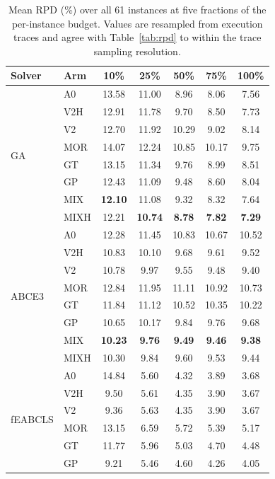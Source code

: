 \documentclass[review]{elsarticle}
\begin{document}
\begin{table}[htbp]
\centering
\caption{Mean RPD (\%) over all 61 instances at five fractions of the
per-instance budget. Values are resampled from execution traces and agree
with Table~\ref{tab:rpd} to within the trace sampling resolution.}
\label{tab:budgetfrac}
\footnotesize
\begin{tabular}{llccccc}
\toprule
Solver & Arm & 10\% & 25\% & 50\% & 75\% & 100\% \\
\midrule
\multirow{8}{*}{GA}
 & A0   & 13.58 & 11.00 & 8.96 & 8.06 & 7.56 \\
 & V2H  & 12.91 & 11.78 & 9.70 & 8.50 & 7.73 \\
 & V2   & 12.70 & 11.92 & 10.29 & 9.02 & 8.14 \\
 & MOR  & 14.07 & 12.24 & 10.85 & 10.17 & 9.75 \\
 & GT   & 13.15 & 11.34 & 9.76 & 8.99 & 8.51 \\
 & GP   & 12.43 & 11.09 & 9.48 & 8.60 & 8.04 \\
 & MIX  & \textbf{12.10} & 11.08 & 9.32 & 8.32 & 7.64 \\
 & MIXH & 12.21 & \textbf{10.74} & \textbf{8.78} & \textbf{7.82} & \textbf{7.29} \\
\midrule
\multirow{8}{*}{ABCE3}
 & A0   & 12.28 & 11.45 & 10.83 & 10.67 & 10.52 \\
 & V2H  & 10.83 & 10.10 & 9.68 & 9.61 & 9.52 \\
 & V2   & 10.78 & 9.97 & 9.55 & 9.48 & 9.40 \\
 & MOR  & 12.84 & 11.95 & 11.11 & 10.92 & 10.73 \\
 & GT   & 11.84 & 11.12 & 10.52 & 10.35 & 10.22 \\
 & GP   & 10.65 & 10.17 & 9.84 & 9.76 & 9.68 \\
 & MIX  & \textbf{10.23} & \textbf{9.76} & \textbf{9.49} & \textbf{9.46} & \textbf{9.38} \\
 & MIXH & 10.30 & 9.84 & 9.60 & 9.53 & 9.44 \\
\midrule
\multirow{8}{*}{fEABCLS}
 & A0   & 14.84 & 5.60 & 4.32 & 3.89 & 3.68 \\
 & V2H  & 9.50 & 5.61 & 4.35 & 3.90 & 3.67 \\
 & V2   & 9.36 & 5.63 & 4.35 & 3.90 & 3.67 \\
 & MOR  & 13.15 & 6.59 & 5.72 & 5.39 & 5.17 \\
 & GT   & 11.77 & 5.96 & 5.03 & 4.70 & 4.48 \\
 & GP   & 9.21 & 5.46 & 4.60 & 4.26 & 4.05 \\

\end{tabular}
\end{table}
\end{document}
